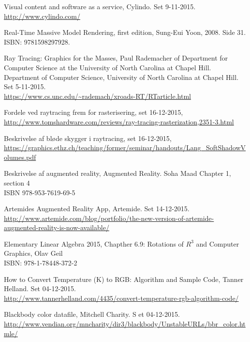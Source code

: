 \begin{thebibliography}{99}
  Visual content and software as a service,
  Cylindo.
  Set 9-11-2015.\\
  \url{http://www.cylindo.com/}
  
  Real-Time Massive Model Rendering, first edition, 
  Sung-Eui Yoon, 2008. Side 31. \\
  ISBN: 9781598297928.

  Ray Tracing: Graphics for the Masses, 
  Paul Rademacher of Department for Computer Science at the University of North Carolina at Chapel Hill.
  Department of Computer Science, University of North Carolina at Chapel Hill.
  Set 5-11-2015.\\
  \url{https://www.cs.unc.edu/~rademach/xroads-RT/RTarticle.html}

  Fordele ved raytracing frem for rasterisering, set 16-12-2015,\\
  \url{http://www.tomshardware.com/reviews/ray-tracing-rasterization,2351-3.html}

  Beskrivelse af bløde skygger i raytracing, set 16-12-2015,\\
  \url{https://graphics.ethz.ch/teaching/former/seminar/handouts/Lang_SoftShadowVolumes.pdf}
  
  Beskrivelse af augmented reality,
  Augmented Reality.
  Soha Maad
  Chapter 1, section 4\\
  ISBN 978-953-7619-69-5

  Artemides Augmented Reality App, 
  Artemide.
  Set 14-12-2015.\\
  \url{http://www.artemide.com/blog/portfolio/the-new-version-of-artemide-augmented-reality-is-now-available/}

  Elementary Linear Algebra 2015, Chapther 6.9: Rotations of $R^{3}$ and Computer Graphics, Olav Geil\\
  ISBN: 978-1-78448-372-2

  How to Convert Temperature (K) to RGB: Algorithm and   Sample Code,
  Tanner Helland.
  Set 04-12-2015.\\
  \url{http://www.tannerhelland.com/4435/convert-temperature-rgb-algorithm-code/}
  
  Blackbody color datafile, 
  Mitchell Charity. S
  et 04-12-2015.\\
  \url{http://www.vendian.org/mncharity/dir3/blackbody/UnstableURLs/bbr_color.htmle/}
  

\end{thebibliography}

